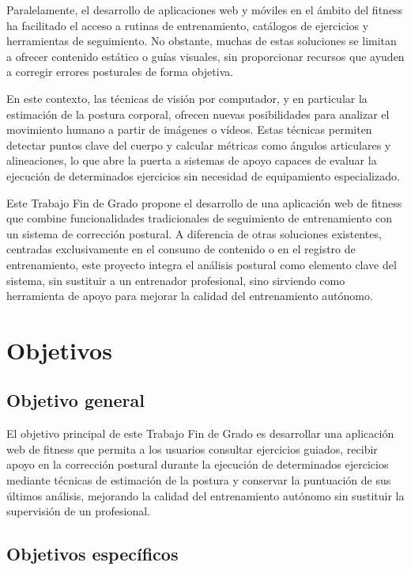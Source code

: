 \documentclass[12pt,a4paper,twoside,openright]{book}
\begin{document}
    Paralelamente, el desarrollo de aplicaciones web y móviles en el ámbito
    del fitness ha facilitado el acceso a rutinas de entrenamiento, catálogos
    de ejercicios y herramientas de seguimiento. No obstante, muchas de estas
    soluciones se limitan a ofrecer contenido estático o guías visuales, sin
    proporcionar recursos que ayuden a corregir errores posturales de forma
    objetiva.
    
    En este contexto, las técnicas de visión por computador, y en particular
    la estimación de la postura corporal, ofrecen nuevas posibilidades para
    analizar el movimiento humano a partir de imágenes o vídeos. Estas
    técnicas permiten detectar puntos clave del cuerpo y calcular métricas
    como ángulos articulares y alineaciones, lo que abre la puerta a sistemas
    de apoyo capaces de evaluar la ejecución de determinados ejercicios sin
    necesidad de equipamiento especializado.
    
    Este Trabajo Fin de Grado propone el desarrollo de una aplicación web de
    fitness que combine funcionalidades tradicionales de seguimiento de
    entrenamiento con un sistema de corrección postural. A diferencia de otras
    soluciones existentes, centradas exclusivamente en el consumo de contenido
    o en el registro de entrenamiento, este proyecto integra el análisis
    postural como elemento clave del sistema, sin sustituir a un entrenador
    profesional, sino sirviendo como herramienta de apoyo para mejorar la
    calidad del entrenamiento autónomo.


    \section{Objetivos}
    
    \subsection{Objetivo general}
    
    El objetivo principal de este Trabajo Fin de Grado es desarrollar una
    aplicación web de fitness que permita a los usuarios consultar ejercicios
    guiados, recibir apoyo en la corrección postural durante la ejecución de
    determinados ejercicios mediante técnicas de estimación de la postura y
    conservar la puntuación de sus últimos análisis, mejorando la calidad del
    entrenamiento autónomo sin sustituir la supervisión de un profesional.
    
    \subsection{Objetivos específicos}
    
\end{document}
